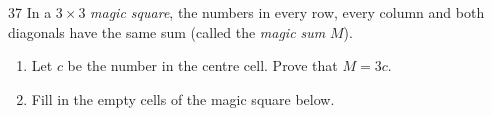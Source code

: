 \begin{probbox}{37}{\relax}
In a $3\times 3$ \emph{magic square}, the numbers in every row, every column and both diagonals have the same sum (called the
\emph{magic sum} $M$).
\begin{enumerate}[label=\alph*),leftmargin=1.6em,itemsep=1pt,topsep=2pt]
  \item Let $c$ be the number in the centre cell. Prove that $M = 3c$.
  \item Fill in the empty cells of the magic square below.
\end{enumerate}
\begin{figC}
\end{figC}
\end{probbox}
